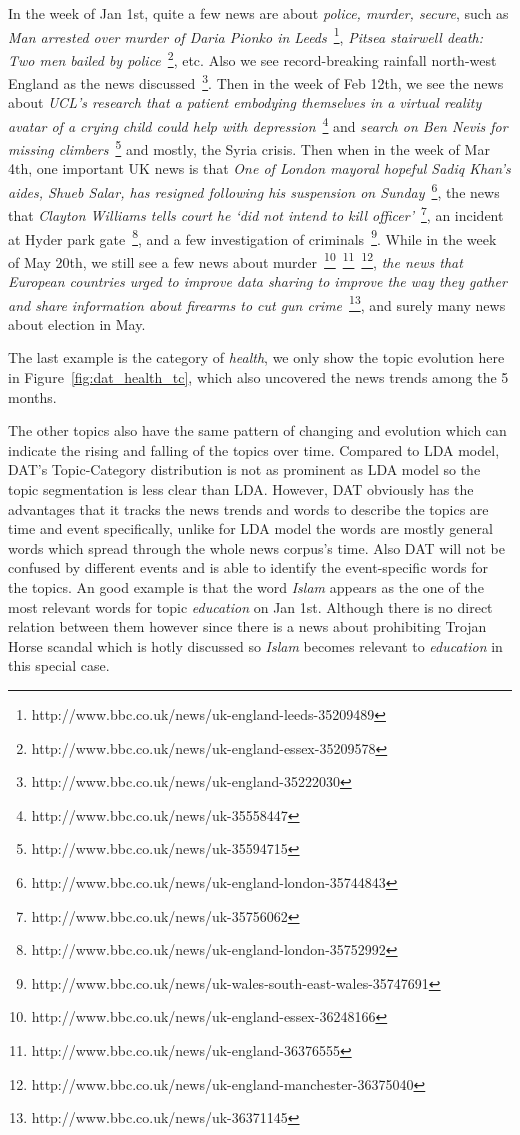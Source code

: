 In the week of Jan 1st, quite a few news are about \textit{police, murder, secure}, such as \textit{Man arrested over murder of Daria Pionko in Leeds}~\footnote{http://www.bbc.co.uk/news/uk-england-leeds-35209489}, \textit{Pitsea stairwell death: Two men bailed by police}~\footnote{http://www.bbc.co.uk/news/uk-england-essex-35209578}, etc. Also we see record-breaking rainfall north-west England as the news discussed~\footnote{http://www.bbc.co.uk/news/uk-england-35222030}. Then in the week of Feb 12th, we see the news about \textit{UCL's research that a patient embodying themselves in a virtual reality avatar of a crying child could help with depression}~\footnote{http://www.bbc.co.uk/news/uk-35558447} and \textit{search on Ben Nevis for missing climbers}~\footnote{http://www.bbc.co.uk/news/uk-35594715} and mostly, the Syria crisis. Then when in the week of Mar 4th, one important UK news is that \textit{One of London mayoral hopeful Sadiq Khan's aides, Shueb Salar, has resigned following his suspension on Sunday}~\footnote{http://www.bbc.co.uk/news/uk-england-london-35744843}, the news that \textit{Clayton Williams tells court he `did not intend to kill officer'}~\footnote{http://www.bbc.co.uk/news/uk-35756062}, an incident at Hyder park gate~\footnote{http://www.bbc.co.uk/news/uk-england-london-35752992}, and a few investigation of criminals~\footnote{http://www.bbc.co.uk/news/uk-wales-south-east-wales-35747691}. While in the week of May 20th, we still see a few news about murder~\footnote{http://www.bbc.co.uk/news/uk-england-essex-36248166}~\footnote{http://www.bbc.co.uk/news/uk-england-36376555}~\footnote{http://www.bbc.co.uk/news/uk-england-manchester-36375040}, \textit{the news that European countries urged to improve data sharing to improve the way they gather and share information about firearms to cut gun crime}~\footnote{http://www.bbc.co.uk/news/uk-36371145}, and surely many news about election in May.

The last example is the category of \textit{health}, we only show the topic evolution here in Figure~\ref{fig:dat_health_tc}, which also uncovered the news trends among the 5 months.


The other topics also have the same pattern of changing and evolution which can indicate the rising and falling of the topics over time. Compared to LDA model, DAT's Topic-Category distribution is not as prominent as LDA model so the topic segmentation is less clear than LDA. However, DAT obviously has the advantages that it tracks the news trends and words to describe the topics are time and event specifically, unlike for LDA model the words are mostly general words which spread through the whole news corpus's time. Also DAT will not be confused by different events and is able to identify the event-specific words for the topics. An good example is that the word \textit{Islam} appears as the one of the most relevant words for topic \textit{education} on Jan 1st. Although there is no direct relation between them however since there is a news about prohibiting Trojan Horse scandal which is hotly discussed so \textit{Islam} becomes relevant to \textit{education} in this special case.


